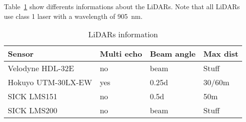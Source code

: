 Table~\ref{tab:lidars} show differents informations about the LiDARs. Note that all LiDARs use class 1 laser with a wavelength of \SI{905}{\nano\meter}.
\begin{table}[htbp]
    \centering
    \begin{tabularx}{\linewidth}{|X||X|X|X|}\hline
        Sensor              & Multi echo & Beam angle & Max dist     \\ \hline%
        Velodyne HDL-32E    & no         & beam       & Stuff        \\ \hline
        Hokuyo UTM-30LX-EW  & yes        & 0.25d      & 30/60m       \\ \hline%
        SICK LMS151         & no         & 0.5d       & 50m          \\ \hline%
        SICK LMS200         & no         & beam       & Stuff        \\ \hline
    \end{tabularx}
    \caption{LiDARs information}\label{tab:lidars}
\end{table}
